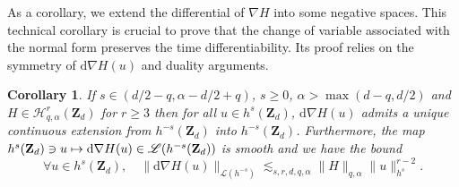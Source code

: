 \documentclass[11pt]{article}
\newcommand\mto{\mathchoice{\longmapsto}{\mapsto}{\mapsto}{\mapsto}}
\newtheorem{corollary}[theorem]{Corollary}
\theoremstyle{definition}
\begin{document}
As a corollary, we extend the differential of $\nabla H$ into some negative spaces. This technical corollary is crucial to prove that the change of variable associated with the normal form preserves the time differentiability. Its proof relies on the symmetry of $\mathrm{d}\nabla H(u)$ and duality arguments.
\begin{corollary} \label{cor_extend} If $s\in (d/2-q, \alpha-d/2+q)$, $s\geq 0$, $\alpha >\max(d-q,d/2)$ and $ H\in \mathscr{H}_{q,\alpha}^r(\mathbf{Z}_d)$ for $r\geq 3$ then for all $u\in h^s(\mathbf{Z}_d)$, $\mathrm{d}\nabla H(u)$ admits a unique continuous extension from $h^{-s}(\mathbf{Z}_d)$ into $h^{-s}(\mathbf{Z}_d)$. Furthermore, the map $ h^s(\mathbf{Z}_d) \ni u \mto \mathrm{d}\nabla H(u) \in \mathscr{L}(h^{-s}(\mathbf{Z}_d))$ is smooth and we have the bound
\[
\forall u \in h^s(\mathbf{Z}_d), \quad \| \mathrm{d}\nabla H(u) \|_{\mathscr{L}(h^{-s})} \lesssim_{s,r,d,q,\alpha} \| H \|_{q,\alpha} \|u\|_{h^s}^{r-2}.
\]
\end{corollary}
\end{document}
